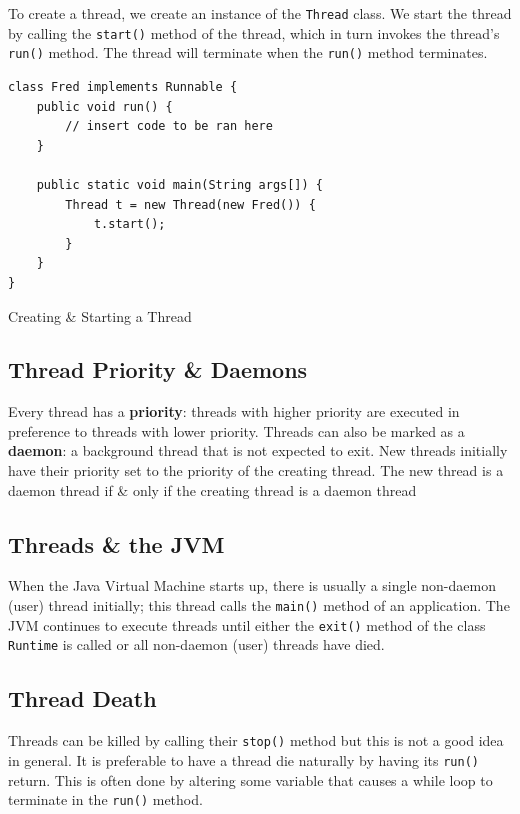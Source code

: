 \documentclass[a4paper,11pt]{article}
\newenvironment{code}{\captionsetup{type=listing}}{}
\begin{document}
To create a thread, we create an instance of the \texttt{Thread} class. 
We start the thread by calling the \texttt{start()} method of the thread, which in turn invokes 
the thread's \texttt{run()} method. 
The thread will terminate when the \texttt{run()} method terminates.
\begin{code}
\begin{verbatim}
class Fred implements Runnable {
    public void run() {
        // insert code to be ran here
    }

    public static void main(String args[]) {
        Thread t = new Thread(new Fred()) {
            t.start();
        }
    }
}
\end{verbatim}
\caption{Creating \& Starting a Thread}
\end{code}

\subsection{Thread Priority \& Daemons}
Every thread has a \textbf{priority}: threads with higher priority are executed in preference to threads 
with lower priority.
Threads can also be marked as a \textbf{daemon}: a background thread that is not expected to exit.
New threads initially have their priority set to the priority of the creating thread.
The new thread is a daemon thread if \& only if the creating thread is a daemon thread

\subsection{Threads \& the JVM}
When the Java Virtual Machine starts up, there is usually a single non-daemon (user) thread initially; this
thread calls the \texttt{main()} method of an application.
The JVM continues to execute threads until either the \texttt{exit()} method of the class 
\texttt{Runtime} is called or all non-daemon (user) threads have died.

\subsection{Thread Death}
Threads can be killed by calling their \texttt{stop()} method but this is not a good idea in general. 
It is preferable to have a thread die naturally by having its \texttt{run()} return. 
This is often done by altering some variable that causes a while loop to terminate in the \texttt{run()}
method.
\end{document}
